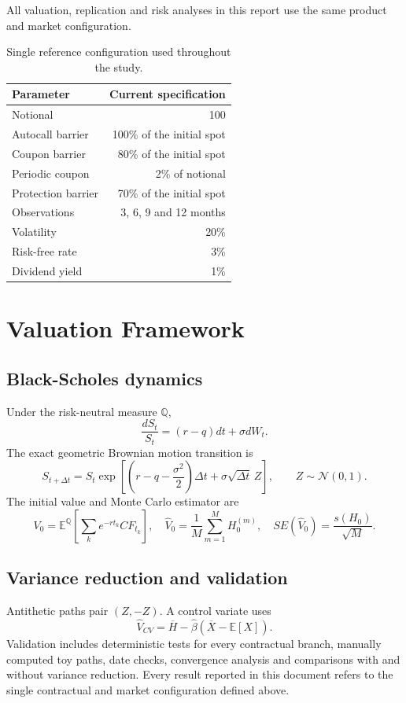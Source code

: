 \documentclass[11pt,a4paper]{article}
\begin{document}
All valuation, replication and risk analyses in this report use the same product and market configuration.

\begin{table}[h]
\centering
\begin{tabular}{lr}
\toprule
Parameter & Current specification\\
\midrule
Notional & 100\\
Autocall barrier & 100\% of the initial spot\\
Coupon barrier & 80\% of the initial spot\\
Periodic coupon & 2\% of notional\\
Protection barrier & 70\% of the initial spot\\
Observations & 3, 6, 9 and 12 months\\
Volatility & 20\%\\
Risk-free rate & 3\%\\
Dividend yield & 1\%\\
\bottomrule
\end{tabular}
\caption{Single reference configuration used throughout the study.}
\end{table}

\section{Valuation Framework}

\subsection{Black-Scholes dynamics}

Under the risk-neutral measure $\mathbb{Q}$,
\[
\frac{dS_t}{S_t}=(r-q)dt+\sigma dW_t.
\]
The exact geometric Brownian motion transition is
\[
S_{t+\Delta t}=S_t\exp\left[
\left(r-q-\frac{\sigma^2}{2}\right)\Delta t
+\sigma\sqrt{\Delta t}\,Z\right],\qquad Z\sim\mathcal{N}(0,1).
\]
The initial value and Monte Carlo estimator are
\[
V_0=\mathbb{E}^{\mathbb{Q}}\left[\sum_k e^{-rt_k}CF_{t_k}\right],
\quad
\widehat V_0=\frac{1}{M}\sum_{m=1}^{M}H_0^{(m)},
\quad
SE(\widehat V_0)=\frac{s(H_0)}{\sqrt{M}}.
\]

\subsection{Variance reduction and validation}

Antithetic paths pair $(Z,-Z)$. A control variate uses
\[
\widehat V_{CV}=\overline H-\widehat\beta(\overline X-\mathbb{E}[X]).
\]
Validation includes deterministic tests for every contractual branch, manually computed toy paths, date checks, convergence analysis and comparisons with and without variance reduction. Every result reported in this document refers to the single contractual and market configuration defined above.
\end{document}
